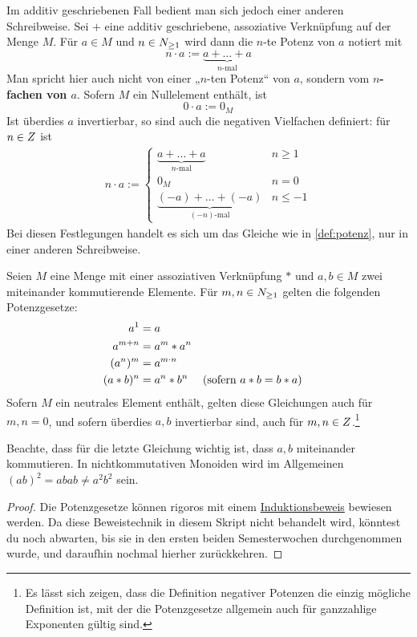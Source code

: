     
\begin{nota}[*]
    Im additiv geschriebenen Fall bedient man sich jedoch einer anderen Schreibweise. Sei $+$ eine additiv geschriebene, assoziative Verknüpfung auf der Menge $M$. Für $a\in M$ und $n\in \relax N_{\ge 1}$ wird dann die $n$-te Potenz von $a$ notiert mit
        \[ n \cdot a := \underbrace{a + \ldots + a}_{n\text{-mal}} \]
    Man spricht hier auch nicht von einer „$n$-ten Potenz“ von $a$, sondern vom \textbf{$n$-fachen von $a$}. Sofern $M$ ein Nullelement enthält, ist
        \[ 0\cdot a := 0_M \]
    Ist überdies $a$ invertierbar, so sind auch die negativen Vielfachen definiert: für $n\in \relax Z$ ist
    \begin{align*}
        n \cdot a := \begin{cases}
            \underbrace{a+ \ldots + a}_{n\text{-mal}} & n \ge 1 \\
            0_M & n= 0 \\
            \underbrace{(-a) + \ldots +  (-a)}_{(-n)\text{-mal}} & n \le -1
        \end{cases}
    \end{align*}
    Bei diesen Festlegungen handelt es sich um das Gleiche wie in \cref{def:potenz}, nur in einer anderen Schreibweise.
\end{nota}


\begin{satz}[* Potenzgesetze] \label{potenzgesetze}
    Seien $M$ eine Menge mit einer assoziativen Verknüpfung $*$ und $a,b\in M$ zwei miteinander kommutierende Elemente. Für $m,n\in \relax N_{\ge 1}$ gelten die folgenden Potenzgesetze:
    \begin{align*}
        a^1 & = a \\
        a^{m+n} & = a^m* a^n \\
        (a^n)^m & = a^{m\cdot n} \\
        (a*b)^n &= a^n*b^n && (\textnormal{sofern $a*b=b*a$})
    \end{align*}
    Sofern $M$ ein neutrales Element enthält, gelten diese Gleichungen auch für $m,n=0$, und sofern überdies $a,b$ invertierbar sind, auch für $m,n\in \relax Z$.\footnote{Es lässt sich zeigen, dass die Definition negativer Potenzen die einzig mögliche Definition ist, mit der die Potenzgesetze allgemein auch für ganzzahlige Exponenten gültig sind.}
\end{satz}
Beachte, dass für die letzte Gleichung wichtig ist, dass $a,b$ miteinander kommutieren. In nichtkommutativen Monoiden wird im Allgemeinen $(ab)^2=abab\neq a^2b^2$ sein.
\begin{proof}
    Die Potenzgesetze können rigoros mit einem \href{https://de.wikipedia.org/wiki/Vollst\%C3\%A4ndige_Induktion}{Induktionsbeweis} bewiesen werden. Da diese Beweistechnik in diesem Skript nicht behandelt wird, könntest du noch abwarten, bis sie in den ersten beiden Semesterwochen durchgenommen wurde, und daraufhin nochmal hierher zurückkehren.
\end{proof}



